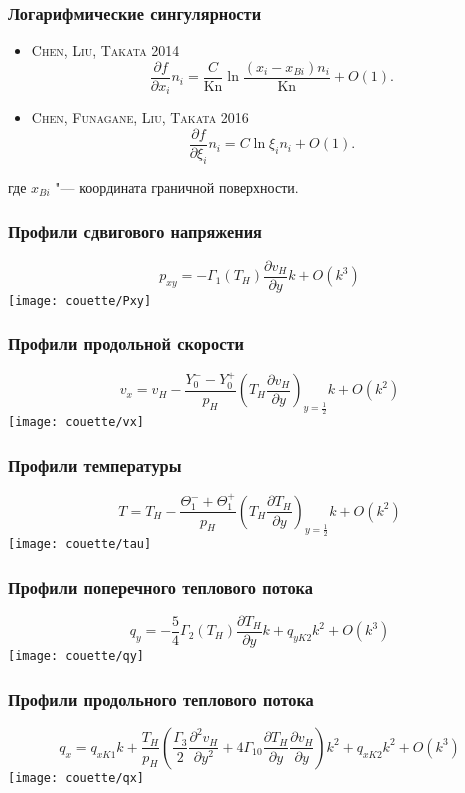 \documentclass[mathserif]{beamer} %
\newcommand{\Kn}{\mathrm{Kn}}
\newcommand{\pder}[2][]{\frac{\partial#1}{\partial#2}}
\newcommand{\pderdual}[2][]{\frac{\partial^2#1}{\partial#2^2}}
\newcommand{\OO}[1]{O(#1)}
\newcommand{\Cite}[2][]{\alert{\textsc{#2 #1}}}
\begin{document}
\begin{frame}
    \frametitle{Логарифмические сингулярности}
    \begin{itemize}
        \item \Cite[2014]{Chen, Liu, Takata}
        \[ \pder[f]{x_i}n_i = \frac{C}{\Kn}\ln\frac{(x_i-x_{Bi})n_i}{\Kn} + \OO{1}. \]
        \item \Cite[2016]{Chen, Funagane, Liu, Takata}
        \[ \pder[f]{\xi_i}n_i = C\ln\xi_in_i + \OO{1}. \]
    \end{itemize}
    где \(x_{Bi}\) "--- координата граничной поверхности.
\end{frame}

\begin{frame}
    \frametitle{Профили сдвигового напряжения}
    \[ p_{xy} = -\Gamma_1(T_H)\pder[v_H]{y}k + \OO{k^3} \]
    \centering
    \texttt{[image: couette/Pxy]}
\end{frame}

\begin{frame}
    \frametitle{Профили продольной скорости}
    \vspace{-5pt}
    \[ v_x = v_H - \frac{Y_0^--Y_0^+}{p_H}\left(T_H\pder[v_H]{y}\right)_{y=\frac12}k + \OO{k^2} \]
    \vspace{-5pt}
    \centering
    \texttt{[image: couette/vx]}
\end{frame}

\begin{frame}
    \frametitle{Профили температуры}
    \vspace{-5pt}
    \[ T = T_H - \frac{\Theta_1^-+\Theta_1^+}{p_H}\left(T_H\pder[T_H]{y}\right)_{y=\frac12}k + \OO{k^2} \]
    \vspace{-5pt}
    \centering
    \texttt{[image: couette/tau]}
\end{frame}

\begin{frame}
    \frametitle{Профили поперечного теплового потока}
    \[ q_y = -\frac54\Gamma_2(T_H)\pder[T_H]{y}k + q_{yK2}k^2 + \OO{k^3} \]
    \centering
    \texttt{[image: couette/qy]}
\end{frame}

\begin{frame}
    \frametitle{Профили продольного теплового потока}
    \vspace{-10pt}
    \[ q_x = q_{xK1}k
        + \frac{T_H}{p_H}\left( \frac{\Gamma_3}2 \pderdual[v_H]{y}
            + 4\Gamma_{10} \pder[T_H]{y}\pder[v_H]{y} \right)k^2
        + q_{xK2}k^2 + \OO{k^3} \]
    \vspace{-10pt}
    \centering
    \texttt{[image: couette/qx]}
\end{frame}
\end{document}
